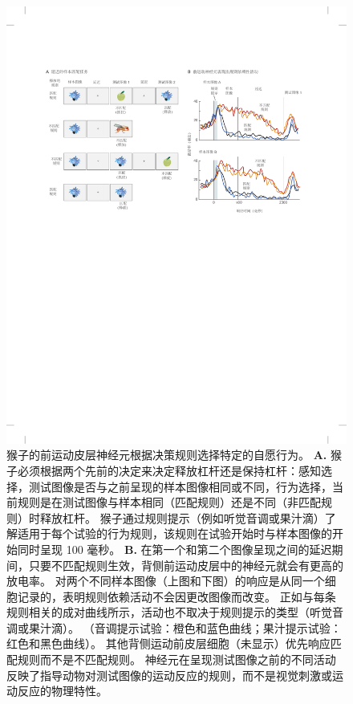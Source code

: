 \begin{figure}[htbp]
	\centering
	\includegraphics[width=1.0\linewidth]{chap34/fig_34_11}
	\caption{猴子的前运动皮层神经元根据决策规则选择特定的自愿行为\cite{wallis2003rule}。
		\textbf{A.} 猴子必须根据两个先前的决定来决定释放杠杆还是保持杠杆：感知选择，测试图像是否与之前呈现的样本图像相同或不同，行为选择，当前规则是在测试图像与样本相同（匹配规则）还是不同（非匹配规则）时释放杠杆。
		猴子通过规则提示（例如听觉音调或果汁滴）了解适用于每个试验的行为规则，该规则在试验开始时与样本图像的开始同时呈现 100 毫秒。
		\textbf{B.} 在第一个和第二个图像呈现之间的延迟期间，只要不匹配规则生效，背侧前运动皮层中的神经元就会有更高的放电率。
		对两个不同样本图像（上图和下图）的响应是从同一个细胞记录的，表明规则依赖活动不会因更改图像而改变。
		正如与每条规则相关的成对曲线所示，活动也不取决于规则提示的类型（听觉音调或果汁滴）。
		（音调提示试验：橙色和蓝色曲线；果汁提示试验：红色和黑色曲线）。
		其他背侧运动前皮层细胞（未显示）优先响应匹配规则而不是不匹配规则。
		神经元在呈现测试图像之前的不同活动反映了指导动物对测试图像的运动反应的规则，而不是视觉刺激或运动反应的物理特性。}
	\label{fig:34_11}
\end{figure}



